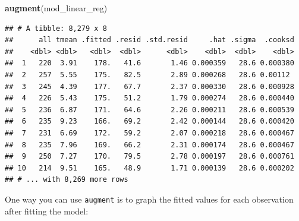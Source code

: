 \documentclass[
]{book}
\newenvironment{Shaded}{\begin{snugshade}}{\end{snugshade}}
\newcommand{\DataTypeTok}[1]{\textcolor[rgb]{0.13,0.29,0.53}{#1}}
\newcommand{\FloatTok}[1]{\textcolor[rgb]{0.00,0.00,0.81}{#1}}
\newcommand{\KeywordTok}[1]{\textcolor[rgb]{0.13,0.29,0.53}{\textbf{#1}}}
\newcommand{\NormalTok}[1]{#1}
\newcommand{\OperatorTok}[1]{\textcolor[rgb]{0.81,0.36,0.00}{\textbf{#1}}}
\newcommand{\StringTok}[1]{\textcolor[rgb]{0.31,0.60,0.02}{#1}}
\begin{document}
\begin{Shaded}
\begin{Highlighting}[]
\KeywordTok{augment}\NormalTok{(mod_linear_reg)}
\end{Highlighting}
\end{Shaded}

\begin{verbatim}
## # A tibble: 8,279 x 8
##      all tmean .fitted .resid .std.resid     .hat .sigma  .cooksd
##    <dbl> <dbl>   <dbl>  <dbl>      <dbl>    <dbl>  <dbl>    <dbl>
##  1   220  3.91    178.   41.6       1.46 0.000359   28.6 0.000380
##  2   257  5.55    175.   82.5       2.89 0.000268   28.6 0.00112 
##  3   245  4.39    177.   67.7       2.37 0.000330   28.6 0.000928
##  4   226  5.43    175.   51.2       1.79 0.000274   28.6 0.000440
##  5   236  6.87    171.   64.6       2.26 0.000211   28.6 0.000539
##  6   235  9.23    166.   69.2       2.42 0.000144   28.6 0.000420
##  7   231  6.69    172.   59.2       2.07 0.000218   28.6 0.000467
##  8   235  7.96    169.   66.2       2.31 0.000174   28.6 0.000467
##  9   250  7.27    170.   79.5       2.78 0.000197   28.6 0.000761
## 10   214  9.51    165.   48.9       1.71 0.000139   28.6 0.000202
## # ... with 8,269 more rows
\end{verbatim}

One way you can use \texttt{augment} is to graph the fitted values for each observation
after fitting the model:

\begin{Shaded}
\end{Shaded}
\end{document}
